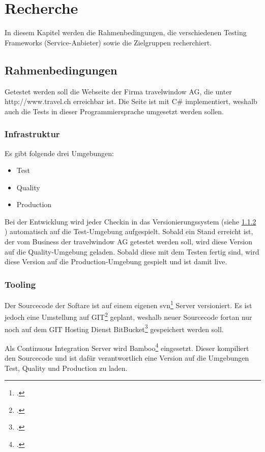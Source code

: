 \chapter{Recherche}

In diesem Kapitel werden die Rahmenbedingungen, die verschiedenen Testing Frameworks (Service-Anbieter) sowie die Zielgruppen recherchiert.

\section{Rahmenbedingungen}
\label{sec:Recherche:Rahmenbedingungen}
Getestet werden soll die Webseite der Firma travelwindow AG, die unter http://www.travel.ch erreichbar ist. Die Seite ist mit C\# implementiert, weshalb auch die Tests in dieser Programmiersprache umgesetzt werden sollen.

\subsection{Infrastruktur}
\label{sec:Recherche:Rahmenbedingungen:Infrastruktur}
Es gibt folgende drei Umgebungen:
\begin{itemize}
\item Test
\item Quality
\item Production
\end{itemize}
Bei der Entwicklung wird jeder Checkin in das Versionierungssystem (siehe \cref{sec:Recherche:Rahmenbedingungen:Tooling} ) automatisch auf die Test-Umgebung aufgespielt. Sobald ein Stand erreicht ist, der vom Business der travelwindow AG getestet werden soll, wird diese Version auf die Quality-Umgebung geladen. Sobald diese mit dem Testen fertig sind, wird diese Version auf die Production-Umgebung gespielt und ist damit live.

\subsection{Tooling}
\label{sec:Recherche:Rahmenbedingungen:Tooling}
Der Sourcecode der Softare ist auf einem eigenen \gls{svn}\footcite{Apache_Subversion_2015-07-26} Server versioniert. Es ist jedoch eine Umstellung auf GIT\footcite{Git_2015-07-26} geplant, weshalb neuer Sourcecode fortan nur noch auf dem GIT Hosting Dienst BitBucket\footcite{Git_and_Mercurial_code_management_for_teams_2015-07-26} gespeichert werden soll.

Als Continuous Integration Server wird Bamboo\footcite{Bamboo_2015-07-26} eingesetzt. Dieser kompiliert den Sourcecode und ist dafür verantwortlich eine Version auf die Umgebungen Test, Quality und Production zu laden.

